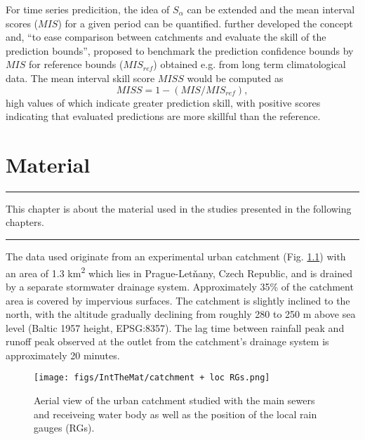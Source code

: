 \documentclass{ctuthesis}\usepackage[]{graphicx}\usepackage[]{color}
\begin{document}
For time series predicition, the idea of $S_\alpha$ can be extended and the mean interval scores ($M\!I\!S$) for a given period can be quantified. \cite{bourginTransferringGlobalUncertainty2015} further developed the concept and, \enquote{to ease comparison between catchments and evaluate the skill of the prediction bounds}, proposed to benchmark the prediction confidence bounds by $M\!I\!S$ for reference bounds ($M\!I\!S_{ref}$) obtained e.g. from long term climatological data. The mean interval skill score $M\!I\!S\!S$ would be computed as 
\begin{equation}
M\!I\!S\!S = 1 -  ( M\!I\!S  /  M\!I\!S_{ref} ),  
\end{equation}
high values of which indicate greater prediction skill, with positive scores indicating that evaluated predictions are more skillful than the reference.



        


\chapter{Material} \label{chap3}

\rule{\textwidth}{0.4pt}
This chapter is about the material used in the studies presented in the following chapters. \newline
\rule[0.2cm]{\textwidth}{0.4pt}


The data used originate from an experimental urban catchment (Fig. \ref{3fig1}) with an area of 1.3 km\textsuperscript{2} which lies in Prague-Letňany, Czech Republic, and is drained by a separate stormwater drainage system. Approximately 35\% of the catchment area is covered by impervious surfaces. The catchment is slightly inclined to the north, with the altitude gradually declining from roughly 280 to 250 m above sea level (Baltic 1957 height, EPSG:8357). The lag time between rainfall peak and runoff peak observed at the outlet from the catchment's drainage system is approximately 20 minutes.


\begin{figure}[H]
\begin{center}
\texttt{[image: figs/IntTheMat/catchment + loc RGs.png]}
\caption{Aerial view of the urban catchment studied with the main sewers and receiveing water body as well as the position of the local rain gauges (RGs).} \label{3fig1}
\end{center}
\end{figure}
\end{document}
